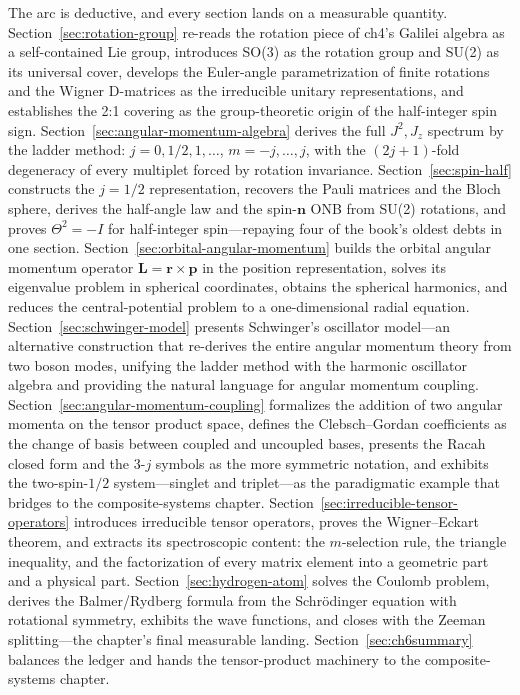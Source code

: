 The arc is deductive, and every section lands on a measurable quantity. Section~\ref{sec:rotation-group} re-reads the rotation piece of ch4's Galilei algebra as a self-contained Lie group, introduces SO(3) as the rotation group and SU(2) as its universal cover, develops the Euler-angle parametrization of finite rotations and the Wigner D-matrices as the irreducible unitary representations, and establishes the 2:1 covering as the group-theoretic origin of the half-integer spin sign. Section~\ref{sec:angular-momentum-algebra} derives the full $J^2,J_z$ spectrum by the ladder method: $j=0,1/2,1,\ldots$, $m=-j,\ldots,j$, with the $(2j+1)$-fold degeneracy of every multiplet forced by rotation invariance. Section~\ref{sec:spin-half} constructs the $j=1/2$ representation, recovers the Pauli matrices and the Bloch sphere, derives the half-angle law and the spin-$\bm n$ ONB from SU(2) rotations, and proves $\Theta^2=-I$ for half-integer spin---repaying four of the book's oldest debts in one section. Section~\ref{sec:orbital-angular-momentum} builds the orbital angular momentum operator $\bm L=\bm r\times\bm p$ in the position representation, solves its eigenvalue problem in spherical coordinates, obtains the spherical harmonics, and reduces the central-potential problem to a one-dimensional radial equation. Section~\ref{sec:schwinger-model} presents Schwinger's oscillator model---an alternative construction that re-derives the entire angular momentum theory from two boson modes, unifying the ladder method with the harmonic oscillator algebra and providing the natural language for angular momentum coupling. Section~\ref{sec:angular-momentum-coupling} formalizes the addition of two angular momenta on the tensor product space, defines the Clebsch--Gordan coefficients as the change of basis between coupled and uncoupled bases, presents the Racah closed form and the 3-$j$ symbols as the more symmetric notation, and exhibits the two-spin-$1/2$ system---singlet and triplet---as the paradigmatic example that bridges to the composite-systems chapter. Section~\ref{sec:irreducible-tensor-operators} introduces irreducible tensor operators, proves the Wigner--Eckart theorem, and extracts its spectroscopic content: the $m$-selection rule, the triangle inequality, and the factorization of every matrix element into a geometric part and a physical part. Section~\ref{sec:hydrogen-atom} solves the Coulomb problem, derives the Balmer/Rydberg formula from the Schr\"odinger equation with rotational symmetry, exhibits the wave functions, and closes with the Zeeman splitting---the chapter's final measurable landing. Section~\ref{sec:ch6summary} balances the ledger and hands the tensor-product machinery to the composite-systems chapter.

